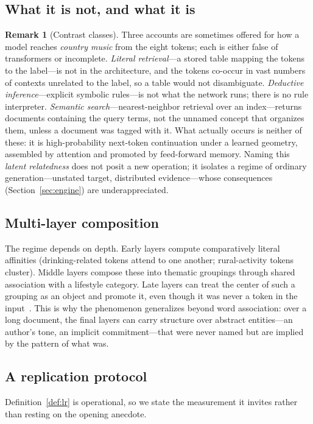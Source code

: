 \documentclass[conference]{IEEEtran}
\theoremstyle{definition}
\newtheorem{remark}{Remark}
\begin{document}
\subsection{What it is not, and what it is}
\begin{remark}[Contrast classes]
Three accounts are sometimes offered for how a model reaches \emph{country music} from the eight tokens; each is either false of transformers or incomplete.
\emph{Literal retrieval}---a stored table mapping the tokens to the label---is not in the architecture, and the tokens co-occur in vast numbers of contexts unrelated to the label, so a table would not disambiguate.
\emph{Deductive inference}---explicit symbolic rules---is not what the network runs; there is no rule interpreter.
\emph{Semantic search}---nearest-neighbor retrieval over an index---returns documents containing the query terms, not the unnamed concept that organizes them, unless a document was tagged with it.
What actually occurs is neither of these: it is high-probability next-token continuation under a learned geometry, assembled by attention and promoted by feed-forward memory. Naming this \emph{latent relatedness} does not posit a new operation; it isolates a regime of ordinary generation---unstated target, distributed evidence---whose consequences (Section~\ref{sec:engine}) are underappreciated.
\end{remark}

\subsection{Multi-layer composition}
The regime depends on depth. Early layers compute comparatively literal affinities (drinking-related tokens attend to one another; rural-activity tokens cluster). Middle layers compose these into thematic groupings through shared association with a lifestyle category. Late layers can treat the center of such a grouping as an object and promote it, even though it was never a token in the input~\cite{geva2021kv,geva2022promote}. This is why the phenomenon generalizes beyond word association: over a long document, the final layers can carry structure over abstract entities---an author's tone, an implicit commitment---that were never named but are implied by the pattern of what was.

\subsection{A replication protocol}
Definition~\ref{def:lr} is operational, so we state the measurement it invites rather than resting on the opening anecdote.
\end{document}
